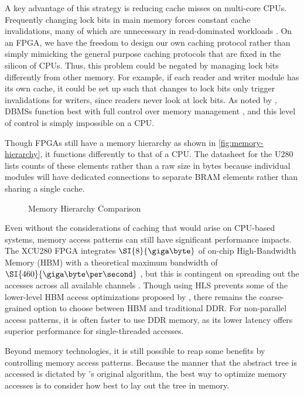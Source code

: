 A key advantage of this strategy is reducing cache misses on multi-core CPUs.
Frequently changing lock bits in main memory forces constant cache
invalidations, many of which are unnecessary in read-dominated workloads
\autocite{leis-damon-2016}. On an FPGA, we have the freedom to design our own
caching protocol rather than simply mimicking the general purpose caching
protocols that are fixed in the silicon of CPUs. Thus, this problem could be
negated by managing lock bits differently from other memory.
%
For example, if each reader and writer module has its own cache, it could be set
up such that changes to lock bits only trigger invalidations for writers, since
readers never look at lock bits. As noted by \citeauthor{binnig-vldb-2016},
DBMSs function best with full control over memory management
\autocite{binnig-vldb-2016}, and this level of control is simply impossible on a
CPU.


\label{subsec:memory-layout}

Though FPGAs still have a memory hierarchy as shown in
\autoref{fig:memory-hierarchy}, it functions differently to that of a CPU. The
datasheet for the U280 lists counts of these elements rather than a raw size in
bytes because individual modules will have dedicated connections to separate
BRAM elements rather than sharing a single cache.

\begin{figure}[H]
	\centering
	
	\caption{Memory Hierarchy Comparison}
	\label{fig:memory-hierarchy}
\end{figure}

Even without the considerations of caching that would arise on CPU-based
systems, memory access patterns can still have significant performance impacts.
The XCU280 FPGA integrates $\SI{8}{\giga\byte}$ of on-chip High-Bandwidth Memory
(HBM) with a theoretical maximum bandwidth of $\SI{460}{\giga\byte\per\second}$
\autocite{u280}, but this is contingent on spreading out the accesses across all
available channels \autocite{holzinger-ipdpsw-2021}.
%
Though using HLS prevents some of the lower-level HBM access optimizations
proposed by \citeauthor{holzinger-ipdpsw-2021} \autocite{holzinger-ipdpsw-2021},
there remains the coarse-grained option to choose between HBM and traditional
DDR. For non-parallel access patterns, it is often faster to use DDR memory, as
its lower latency offers superior performance for single-threaded accesses.

Beyond memory technologies, it is still possible to reap some benefits by
controlling memory access patterns. Because the manner that the abstract tree is
accessed is dictated by \citeauthor{b-link}'s original algorithm, the best way
to optimize memory accesses is to consider how best to lay out the tree in
memory.

